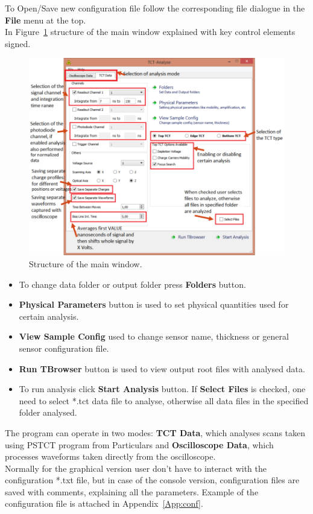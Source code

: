 \documentclass[12pt,oneside,notitlepage,abstracton,a4paper]{scrartcl}
\begin{document}
\indent To Open/Save new configuration file follow the corresponding file dialogue in the \textbf{File} menu at the top.
\\ \indent In Figure~\ref{fig:main_structure} structure of the main window explained with key control elements signed. 

\begin{figure}[h]
    \centering
    \includegraphics[width=18cm]{pics/main_structure}
    \caption{Structure of the main window.}
    \label{fig:main_structure}
\end{figure}

\begin{itemize}
\item To change data folder or output folder press \textbf{Folders} button.
\item \textbf{Physical Parameters} button is used to set physical quantities used for certain analysis.
\item \textbf{View Sample Config} used to change sensor name, thickness or general sensor configuration file.
\item \textbf{Run TBrowser} button is used to view output root files with analysed data.
\item To run analysis click \textbf{Start Analysis} button. If \textbf{Select Files} is checked, one need to select *.tct data file to analyse, otherwise all data files in the specified folder analysed.
\end{itemize}

\indent The program can operate in two modes: \textbf{TCT Data}, which analyses scans taken using PSTCT program from Particulars and \textbf{Oscilloscope Data}, which processes waveforms taken directly from the oscilloscope.
\\ \indent Normally for the graphical version user don't have to interact with the configuration *.txt file, but in case of the console version, configuration files are saved with comments, explaining all the parameters. Example of the configuration file is attached in Appendix~\ref{App:conf}.
\end{document}
